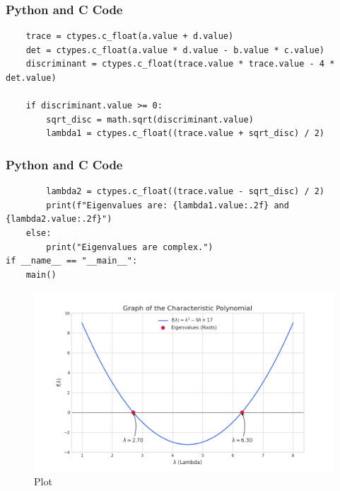 \documentclass{beamer}
\begin{document}
\begin{frame}[fragile]
\frametitle{Python and C Code}
\begin{lstlisting}
    trace = ctypes.c_float(a.value + d.value)
    det = ctypes.c_float(a.value * d.value - b.value * c.value)
    discriminant = ctypes.c_float(trace.value * trace.value - 4 * det.value)

    if discriminant.value >= 0:
        sqrt_disc = math.sqrt(discriminant.value)
        lambda1 = ctypes.c_float((trace.value + sqrt_disc) / 2)
\end{lstlisting}
\end{frame}

\begin{frame}[fragile]
\frametitle{Python and C Code}
\begin{lstlisting}
        lambda2 = ctypes.c_float((trace.value - sqrt_disc) / 2)
        print(f"Eigenvalues are: {lambda1.value:.2f} and {lambda2.value:.2f}")
    else:
        print("Eigenvalues are complex.")
if __name__ == "__main__":
    main()

\end{lstlisting}
\end{frame}

\begin{frame}
\begin{figure}
    \centering
    \includegraphics[width=0.75\columnwidth]{graph23.png}
    \caption{Plot}
    \label{fig:placeholder}
\end{figure}
\end{frame}
\end{document}
